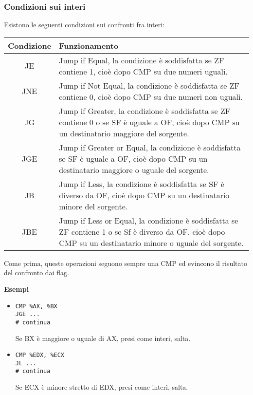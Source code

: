 \documentclass[a4paper,11pt]{article}
\begin{document}
\subsubsection{Condizioni sui interi}
Esistono le seguenti condizioni sui confronti fra interi:

\begin{table}[h!]
	\center {}
	\begin{tabular} { c  p{10cm} }
		\bfseries Condizione & \bfseries Funzionamento \\
		\hline 
		JE & Jump if Equal, la condizione è soddisfatta se ZF contiene 1, cioè dopo CMP su due numeri uguali. \\
		JNE & Jump if Not Equal, la condizione è soddisfatta se ZF contiene 0, cioè dopo CMP su due numeri non uguali. \\ 
		JG & Jump if Greater, la condizione è soddisfatta se ZF contiene 0 o se SF è uguale a OF, cioè dopo CMP su un destinatario maggiore del sorgente. \\
		JGE & Jump if Greater or Equal, la condizione è soddisfatta se SF è uguale a OF, cioè dopo CMP su un destinatario maggiore o uguale del sorgente. \\ 
		JB & Jump if Less, la condizione è soddisfatta se SF è diverso da OF, cioè dopo CMP su un destinatario minore del sorgente. \\
		JBE & Jump if Less or Equal, la condizione è soddisfatta se ZF contiene 1 o se Sf è diverso da OF, cioè dopo CMP su un destinatario minore o uguale del sorgente. \\ 
	\end{tabular}
\end{table}

Come prima, queste operazioni seguono sempre una CMP ed evincono il risultato del confronto dai flag.

\par\medskip
\noindent
\textbf{\textsf{Esempi}} \\
\begin{itemize}
	\item 
\begin{lstlisting}[style=codestyle]	
CMP %AX, %BX
JGE ...
# continua
\end{lstlisting}
Se BX è maggiore o uguale di AX, presi come interi, salta.

	\item 
\begin{lstlisting}[style=codestyle]	
CMP %EDX, %ECX
JL ...
# continua
\end{lstlisting}
Se ECX è minore stretto di EDX, presi come interi, salta.
\end{itemize}
\end{document}
